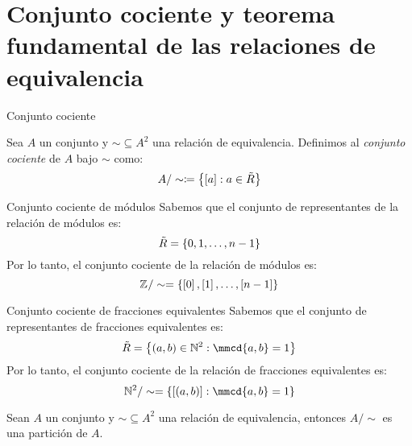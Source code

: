 \section{Conjunto cociente y teorema fundamental de las relaciones de equivalencia}
\begin{frame}{Conjunto cociente}
	\begin{mdefinition}
		Sea $ A $ un conjunto y $ \sim\subseteq A^{2} $ una relación de equivalencia. Definimos al \emph{conjunto cociente} de $ A $ bajo $ \sim $ como:
		\[ A/\sim\coloneqq\left\{ \left[ a \right]: a\in\tilde{R} \right\} \]
	\end{mdefinition}
\end{frame}
\begin{frame}{Conjunto cociente de módulos}
	Sabemos que el conjunto de representantes de la relación de módulos es:
	\[ \tilde{R} =\left\{ 0, 1,\dotsc, n - 1 \right\} \]
	Por lo tanto, el conjunto cociente de la relación de módulos es:
	\[ \mathbb{Z}^{} / \sim =\left\{ \left[ 0 \right],\left[ 1 \right],\dotsc,\left[ n - 1 \right] \right\} \]
\end{frame}
\begin{frame}{Conjunto cociente de fracciones equivalentes}
	Sabemos que el conjunto de representantes de fracciones equivalentes es:
	\[ \tilde{R} =\set{(a, b)\in\nmath[2]: \mmcd{a, b} = 1} \]
	Por lo tanto, el conjunto cociente de la relación de fracciones equivalentes es:
	\[ \nmath[2] / \sim =\set{\bracket{(a, b)}: \mmcd{a, b} = 1} \]
\end{frame}
\begin{frame}
	\begin{mtheorem}
		\label{thm: particion}
		Sean $A$ un conjunto y $\sim\subseteq A^{2}$ una relación de equivalencia, entonces $A / \sim$ es una partición de $A$.
	\end{mtheorem}
\end{frame}
